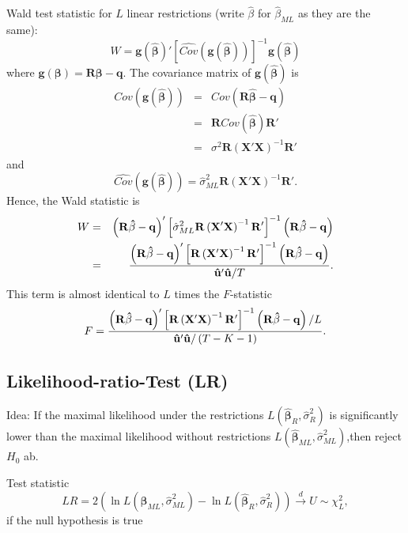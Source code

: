 \documentclass{article}
\begin{document}
Wald test statistic for $L$ linear restrictions  (write $\hat\beta$ for $\hat\beta_{ML}$ as they are the same):
\[W=\mathbf{g}\left( \mathbf{\hat{\beta}}\right) '\left[ \widehat{Cov}%
\left( \mathbf{g}\left( \mathbf{\hat{\beta}}\right) \right) \right] ^{-1}%
\mathbf{g}\left( \mathbf{\hat{\beta}}\right) \]
where $\mathbf{g}(\mathbf{\beta })=\mathbf{R\beta }-\mathbf{q}.$ The
covariance matrix of  $\mathbf{g}(\mathbf{\hat{\beta}})$ is
\begin{eqnarray*}
Cov( \mathbf{g}( \mathbf{\hat{\beta}})) &=&Cov(\mathbf{R\hat{\beta}}-\mathbf{q}) \\
&=&\mathbf{R}Cov(\mathbf{\hat{\beta}})\mathbf{R}' \\
&=&\sigma ^{2}\mathbf{R}\left( \mathbf{X}'\mathbf{X}\right) ^{-1}%
\mathbf{R}'
\end{eqnarray*}%
and
\[\widehat{Cov}( \mathbf{g}( \mathbf{\hat{\beta}})) =%
\hat{\sigma}_{ML}^{2}\mathbf{R}\left( \mathbf{X}'\mathbf{X}\right)
^{-1}\mathbf{R}'. \]%
Hence, the Wald statistic is
\begin{eqnarray*}
W &=&\left( \mathbf{R\hat{\beta}}-\mathbf{q}\right) '\left[ \hat{%
\sigma}_{ML}^{2}\mathbf{R}\left( \mathbf{X}'\mathbf{X}\right) ^{-1}%
\mathbf{R}'\right] ^{-1}\left( \mathbf{R\hat{\beta}}-\mathbf{q}%
\right) \\
&=&\frac{\left( \mathbf{R\hat{\beta}}-\mathbf{q}\right) '\left[ 
\mathbf{R}\left( \mathbf{X}'\mathbf{X}\right) ^{-1}\mathbf{R}%
'\right] ^{-1}\left( \mathbf{R\hat{\beta}}-\mathbf{q}\right) }{%
\mathbf{\hat{u}}'\mathbf{\hat{u}/}T}.
\end{eqnarray*}
This term is almost identical to $L$ times the $F$-statistic
\[F=\frac{\left( \mathbf{R\hat{\beta}}-\mathbf{q}\right) '\left[ 
\mathbf{R}\left( \mathbf{X}'\mathbf{X}\right) ^{-1}\mathbf{R}%
'\right] ^{-1}\left( \mathbf{R\hat{\beta}}-\mathbf{q}\right) /L}{%
\mathbf{\hat{u}}'\mathbf{\hat{u}}/\left( T-K-1\right) }. \]

\subsection*{Likelihood-ratio-Test (LR)}

Idea: If the maximal likelihood under the restrictions
$L(\mathbf{\hat{\beta}}_{R},\hat{\sigma}_{R}^{2})$ is significantly lower than the maximal
likelihood without restrictions $L(\mathbf{\hat{\beta}}_{ML},\hat{\sigma}_{ML}^{2})$,then 
reject $H_{0}$ ab.

Test statistic
\begin{equation*}
LR=2\left( \ln L\left( \mathbf{\hat{\beta}}_{ML},\hat{\sigma}%
_{ML}^{2}\right) -\ln L\left( \mathbf{\hat{\beta}}_{R},\hat{\sigma}%
_{R}^{2}\right) \right) \overset{d}{\rightarrow }U\sim \chi _{L}^{2},
\end{equation*}%
if the null hypothesis is true
\end{document}

